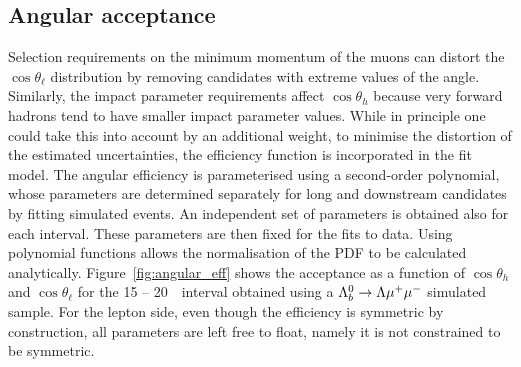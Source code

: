 

\subsection{Angular acceptance}
\label{sec:AngEff}

Selection requirements on the minimum momentum of the muons can distort the $\cos\theta_\ell$ 
distribution by removing candidates with extreme values of the angle. Similarly, 
the impact parameter requirements affect $\cos\theta_h$ because very forward hadrons tend
to have smaller impact parameter values. While in principle one could take this into account
by an additional weight, to minimise the distortion of the estimated uncertainties,
the efficiency function is incorporated in the fit model. The angular efficiency is
parameterised using a second-order polynomial, whose parameters are determined separately for long 
and downstream candidates by fitting simulated events. An independent set of parameters is obtained
also for each \qsq interval. These parameters are then fixed for the fits to data.
Using polynomial functions allows the normalisation of the PDF to be calculated analytically.
Figure~\ref{fig:angular_eff} shows the acceptance as a function of $\cos\theta_h$ and 
$\cos\theta_\ell$ for the 15 -- 20~\gevgevcccc~\qsq interval obtained using a $\Lambda^0_b\rightarrow\Lambda\mu^+\mu^-$ simulated sample.
%
For the lepton side, even though the efficiency is symmetric by construction,
all parameters are left free to float, namely it is not constrained to be symmetric.

